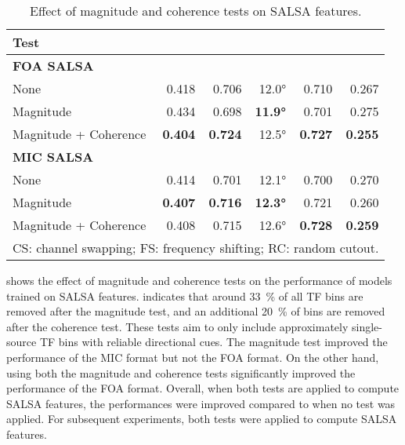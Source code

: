 \documentclass[journal]{IEEEtran}
\begin{document}
\begin{table}[t]
    \setlength\tabcolsep{3pt}
    \centering
    \caption{Effect of magnitude and coherence tests on SALSA features.}
    \noindent\begin{tabularx}{\columnwidth}{Xrrrrr}
    \toprule 
        Test&
          &
          &
         &
          &
         
        \\ \midrule
       \bfseries FOA SALSA\\
        
        None    & 0.418 & 0.706 & 12.0\si{\degree} & 0.710 & 0.267\\
        Magnitude    & 0.434 & 0.698 & \bf{11.9\si{\degree}} & 0.701 & 0.275\\
        Magnitude + Coherence
                & \bf{0.404} & \bf{0.724} & 12.5\si{\degree} & \bf{0.727} & \bf{0.255}\\
        \midrule
        \bfseries MIC SALSA\\
        
        None  & 0.414 & 0.701 & 12.1\si{\degree} & 0.700 & 0.270 \\
        Magnitude    & \bf{0.407} & \bf{0.716} & \bf{12.3\si{\degree}} & 0.721 & 0.260 \\
        Magnitude + Coherence  & 0.408 & 0.715 & 12.6\si{\degree} & \bf{0.728} & \bf{0.259} \\ 
    \bottomrule
    \multicolumn{6}{l}{CS: channel swapping; FS: frequency shifting; RC: random cutout.}
    \label{tab:sp_test}
    \end{tabularx}
\end{table}

 shows the effect of magnitude and coherence tests on the performance of models trained on SALSA features.  indicates that around \SI{33}{\percent} of all TF bins are removed after the magnitude test, and an additional \SI{20}{\percent} of bins are removed after the coherence test. These tests aim to only include approximately single-source TF bins with reliable directional cues. The magnitude test improved the performance of the MIC format but not the FOA format. On the other hand, using both the magnitude and coherence tests significantly improved the performance of the FOA format. Overall, when both tests are applied to compute SALSA features, the performances were improved compared to when no test was applied. For subsequent experiments, both tests were applied to compute SALSA features. 
\end{document}
